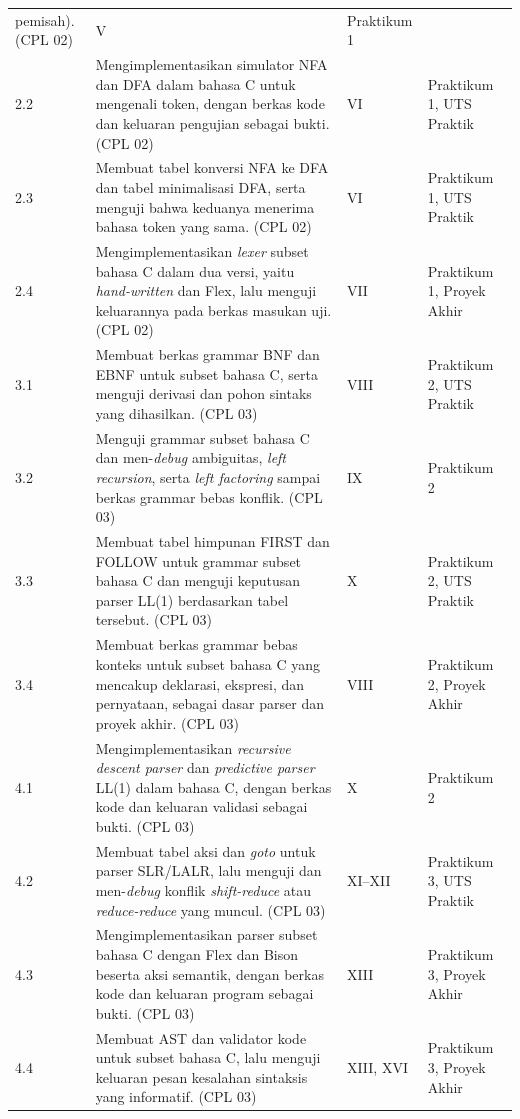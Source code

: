{\begin{longtable}{@{}p{1.2cm}p{7.8cm}p{1.6cm}p{3.5cm}@{}}
pemisah). (CPL 02) & V & Praktikum 1 \\
2.2 & Mengimplementasikan simulator NFA dan DFA dalam bahasa C untuk
mengenali token, dengan berkas kode dan keluaran pengujian sebagai
bukti. (CPL 02) & VI & Praktikum 1, UTS Praktik \\
2.3 & Membuat tabel konversi NFA ke DFA dan tabel minimalisasi DFA,
serta menguji bahwa keduanya menerima bahasa token yang sama.
(CPL 02) & VI & Praktikum 1, UTS Praktik \\
2.4 & Mengimplementasikan \textit{lexer} subset bahasa C dalam dua
versi, yaitu \textit{hand-written} dan Flex, lalu menguji keluarannya
pada berkas masukan uji. (CPL 02) & VII & Praktikum 1, Proyek Akhir \\
3.1 & Membuat berkas grammar BNF dan EBNF untuk subset bahasa C, serta
menguji derivasi dan pohon sintaks yang dihasilkan. (CPL 03) & VIII &
Praktikum 2, UTS Praktik \\
3.2 & Menguji grammar subset bahasa C dan men-\textit{debug}
ambiguitas, \textit{left recursion}, serta \textit{left factoring}
sampai berkas grammar bebas konflik. (CPL 03) & IX & Praktikum 2 \\
3.3 & Membuat tabel himpunan FIRST dan FOLLOW untuk grammar subset
bahasa C dan menguji keputusan parser LL(1) berdasarkan tabel
tersebut. (CPL 03) & X & Praktikum 2, UTS Praktik \\
3.4 & Membuat berkas grammar bebas konteks untuk subset bahasa C yang
mencakup deklarasi, ekspresi, dan pernyataan, sebagai dasar parser dan
proyek akhir. (CPL 03) & VIII & Praktikum 2, Proyek Akhir \\
4.1 & Mengimplementasikan \textit{recursive descent parser} dan
\textit{predictive parser} LL(1) dalam bahasa C, dengan berkas kode
dan keluaran validasi sebagai bukti. (CPL 03) & X & Praktikum 2 \\
4.2 & Membuat tabel aksi dan \textit{goto} untuk parser SLR/LALR, lalu
menguji dan men-\textit{debug} konflik \textit{shift-reduce} atau
\textit{reduce-reduce} yang muncul. (CPL 03) & XI--XII & Praktikum 3,
UTS Praktik \\
4.3 & Mengimplementasikan parser subset bahasa C dengan Flex dan Bison
beserta aksi semantik, dengan berkas kode dan keluaran program sebagai
bukti. (CPL 03) & XIII & Praktikum 3, Proyek Akhir \\
4.4 & Membuat AST dan validator kode untuk subset bahasa C, lalu
menguji keluaran pesan kesalahan sintaksis yang informatif.
(CPL 03) & XIII, XVI & Praktikum 3, Proyek Akhir \\
\end{longtable}
}

